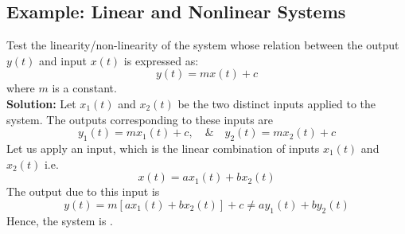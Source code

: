\documentclass[../notes-main.tex]{subfiles}
\begin{document}
\subsection{Example: Linear and Nonlinear Systems}
Test the linearity/non-linearity of the system whose relation between the output \(y(t)\) and input \(x(t)\) is expressed as:
\begin{equation}
    y(t) = mx(t) + c
    \label{eq:linear-nonlinear-example-io-relation}
\end{equation}
\noindent where \(m\) is a constant.\\
\textbf{Solution:}
Let \(x_1(t)\) and \(x_2(t)\) be the two distinct inputs applied to the system. The outputs corresponding to these inputs are
\begin{equation}
    y_1(t) = mx_1(t) + c, \quad \& \quad y_2(t) = mx_2(t) + c
    \label{eq:linear-nonlinear-example-output-distinct-equation}
\end{equation}
\noindent Let us apply an input, which is the linear combination of inputs \(x_1(t)\) and \(x_2(t)\) i.e.
\begin{equation}
    x(t) = ax_1(t) + bx_2(t)
    \label{eq:linear-nonlinear-example-input-equation}
\end{equation}
\noindent The output due to this input is
\begin{equation}
    y(t) = m[ax_1(t) + bx_2(t)] + c \neq ay_1(t) + by_2(t)
    \label{eq:linear-nonlinear-example-inequality-output-equation}
\end{equation}
\noindent Hence, the system is .
\end{document}
